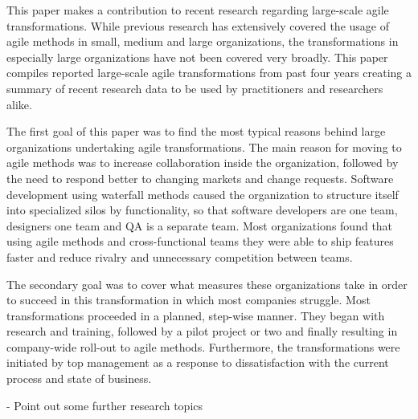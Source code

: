 This paper makes a contribution to recent research regarding large-scale
agile transformations. While previous research has extensively covered
the usage of agile methods in small, medium and large organizations,
the transformations in especially large organizations have not been
covered very broadly. This paper compiles reported large-scale agile
transformations from past four years creating a summary of recent
research data to be used by practitioners and researchers alike.

The first goal of this paper was to find the most typical reasons behind
large organizations undertaking agile transformations. The main reason
for moving to agile methods was to increase collaboration inside the
organization, followed by the need to respond better to changing markets
and change requests. Software development using waterfall methods
caused the organization to structure itself into specialized silos by
functionality, so that software developers are one team, designers one
team and QA is a separate team. Most organizations found that using
agile methods and cross-functional teams they were able to ship features
faster and reduce rivalry and unnecessary competition between teams.

The secondary goal was to cover what measures these organizations take
in order to succeed in this transformation in which most companies
struggle. Most transformations proceeded in a planned, step-wise manner.
They began with research and training, followed by a pilot project or
two and finally resulting in company-wide roll-out to agile methods.
Furthermore, the transformations were initiated by top management as
a response to dissatisfaction with the current process and state of
business.


- Point out some further research topics
